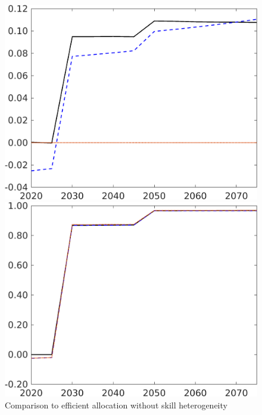 \begin{figure}[h!!]
	\centering
	\caption{Comparison to efficient allocation without skill heterogeneity }\label{fig:Compno_eff_noskill}
		\begin{minipage}[]{0.32\textwidth}
		\includegraphics[width=1\textwidth]{../../codding_model/own_basedOnFried/optimalPol_elastS_DisuSci/figures/all_1705/taul_CompEffOPT_T_NoTaus_spillover0_noskill1_sep1_BN0_ineq0_red0_etaa0.79_lgd0.png}
	\end{minipage}
	\begin{minipage}[]{0.32\textwidth}
	\includegraphics[width=1\textwidth]{../../codding_model/own_basedOnFried/optimalPol_elastS_DisuSci/figures/all_1705/tauf_CompEffOPT_T_NoTaus_spillover0_noskill1_sep1_BN0_ineq0_red0_etaa0.79_lgd0.png}

\end{minipage}
\end{figure}
